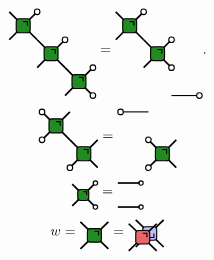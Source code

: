 \documentclass[a4paper,twocolumn,11pt,accepted=2024-02-08]{quantumarticle}
\theoremstyle{break}
\newcommand{\1}{\mathbbm{1}}
\theoremstyle{plain}
\theoremstyle{plain}
\theoremstyle{plain}
\newcommand{\Wgatered}[2]{
\draw[very thick] (#1-0.5, #2 +0.5) -- (#1+0.5,#2-0.5);
\draw[very thick] (#1-0.5,#2-0.5) -- (#1+0.5,#2+0.5);
\draw[ thick, fill=myred, rounded corners=2pt] (#1-0.25,#2+0.25) rectangle (#1+0.25,#2-0.25);
\draw[thick] (#1,#2+0.15) -- (#1+0.15,#2+0.15) -- (#1+0.15,#2);
}
\newcommand{\WgateblueT}[2]{
\draw[very thick] (#1-0.5, #2 +0.5) -- (#1+0.5,#2-0.5);
\draw[very thick] (#1-0.5,#2-0.5) -- (#1+0.5,#2+0.5);
\draw[ thick, fill=myblue, rounded corners=2pt] (#1-0.25,#2+0.25) rectangle (#1+0.25,#2-0.25);
\draw[thick] (#1,#2-0.15) -- (#1+0.15,#2-0.15) -- (#1+0.15,#2);
}
\newcommand{\Wgategreen}[2]{
\draw[very thick] (#1-0.5, #2 +0.5) -- (#1+0.5,#2-0.5);
\draw[very thick] (#1-0.5,#2-0.5) -- (#1+0.5,#2+0.5);
\draw[ thick, fill=mygreen, rounded corners=2pt] (#1-0.25,#2+0.25) rectangle (#1+0.25,#2-0.25);
\draw[thick] (#1,#2+0.15) -- (#1+0.15,#2+0.15) -- (#1+0.15,#2);
}
\newcommand{\MYcircle}[2]{
\draw[thick, fill=white] (#1,#2) circle (0.1cm); }
\begin{document}
\begin{equation}
    \begin{tikzpicture}[baseline=(current  bounding  box.center), scale=0.7]
    \Wgategreen{-1.5}{0.5}
    \Wgategreen{-0.5}{-0.5}
    \Wgategreen{-2.5}{1.5}
    \MYcircle{-1}{1}
    \MYcircle{0}{0}
    \MYcircle{0}{-1}
    \MYcircle{-2}{2}
    \end{tikzpicture}
    =
    \begin{tikzpicture}[baseline=(current  bounding  box.center), scale=0.7]
    \Wgategreen{-1.5}{0.5}
    \Wgategreen{-2.5}{1.5}
    \draw[thick] (-1,-1)--(0,-1);
    \MYcircle{0}{-1}
    \MYcircle{-1}{0}
    \MYcircle{-1}{1}
    \MYcircle{-2}{2}
    \end{tikzpicture}
    .\label{eq:3rdHierarchydefinition}
\end{equation}
\begin{equation}
    \begin{tikzpicture}[baseline=(current  bounding  box.center), scale=0.7]
        \Wgategreen{-0.5}{0.5}
        \Wgategreen{0.5}{-0.5}
        \MYcircle{-1}{1}
        \MYcircle{-1}{0}
        \MYcircle{0}{-1}
        \end{tikzpicture}
        =
        \begin{tikzpicture}[baseline=(current  bounding  box.center), scale=0.7]
        \Wgategreen{0.5}{-0.5}
        \draw[thick] (0,1)--(-1,1);
        \MYcircle{-1}{1}
        \MYcircle{0}{0}
        \MYcircle{0}{-1}
    \end{tikzpicture}
\end{equation}
\begin{equation}
    \begin{tikzpicture}[baseline=(current  bounding  box.center), scale=0.55]
        \Wgategreen{0}{0}
        \MYcircle{0.55}{0.55}
        \MYcircle{0.55}{-0.55}
        \end{tikzpicture}
        =
        \begin{tikzpicture}[baseline=(current  bounding  box.center), scale=0.55]
        \MYcircle{0.55}{0.55}
        \MYcircle{0.55}{-0.55}
        \draw[very thick] (-0.5,0.55) -- (0.5,0.55);
        \draw[very thick] (-0.5,-0.55) -- (0.5,-0.55);
    \end{tikzpicture}
\end{equation}
\begin{equation}
    w=\begin{tikzpicture}[baseline=(current  bounding  box.center), scale=0.7]
    \Wgategreen{0}{0}
    \end{tikzpicture}
    =
    \begin{tikzpicture}[baseline=(current  bounding  box.center), scale=0.7]
    \WgateblueT{0.15}{0.07}
    \Wgatered{-0.1}{-0.07}
    \end{tikzpicture}
\end{equation}
\end{document}
